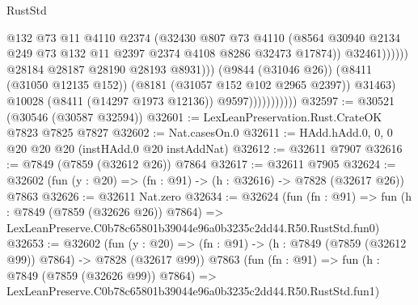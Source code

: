 \begin{lexlean}{RustStd}
\begin{coremodule}
                                              @132
                                              @73
                                              @11
                                              @4110
                                              @2374
                                              (@32430
                                                @807
                                                @73
                                                @4110
                                                (@8564
                                                  @30940
                                                  @2134
                                                  @249
                                                  @73
                                                  @132
                                                  @11
                                                  @2397
                                                  @2374
                                                  @4108
                                                  @8286
                                                  @32473
                                                  @17874))
                                              @32461))))))
                                  @28184
                                  @28187
                                  @28190
                                  @28193
                                  @8931)))
                            (@9844 (@31046 @26))
                            (@8411 (@31050 @12135 @152))
                            (@8181 (@31057 @152 @102 @2965 @2397))
                            @31463)
                          @10028
                          (@8411 (@14297 @1973 @12136))
                          @9597)))))))))))
@32597 := @30521 (@30546 (@30587 @32594))
@32601 := LexLeanPreservation.Rust.CrateOK @7823 @7825 @7827
@32602 := Nat.casesOn.{0}
@32611 := HAdd.hAdd.{0, 0, 0} @20 @20 @20 (instHAdd.{0} @20 instAddNat)
@32612 := @32611 @7907
@32616 := @7849 (@7859 (@32612 @26)) @7864
@32617 := @32611 @7905
@32624 := @32602 (fun (y : @20) => (fn : @91) -> (h : @32616) -> @7828 (@32617 @26)) @7863
@32626 := @32611 Nat.zero
@32634 := @32624
    (fun (fn : @91) =>
    fun (h : @7849 (@7859 (@32626 @26)) @7864) =>
    LexLeanPreserve.C0b78c65801b39044e96a0b3235c2dd44.R50.RustStd.fun0)
@32653 := @32602
    (fun (y : @20) => (fn : @91) -> (h : @7849 (@7859 (@32612 @99)) @7864) -> @7828 (@32617 @99))
    @7863
    (fun (fn : @91) =>
    fun (h : @7849 (@7859 (@32626 @99)) @7864) =>
    LexLeanPreserve.C0b78c65801b39044e96a0b3235c2dd44.R50.RustStd.fun1)

\end{coremodule}
\end{lexlean}
